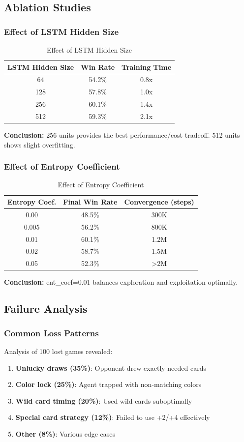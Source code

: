 \documentclass[12pt,a4paper]{article}
\begin{document}
\subsection{Ablation Studies}
\subsubsection{Effect of LSTM Hidden Size}
\begin{table}[H]
\centering
\begin{tabular}{ccc}
\toprule
\textbf{LSTM Hidden Size} & \textbf{Win Rate} & \textbf{Training Time} \\
\midrule
64 & 54.2\% & 0.8x \\
128 & 57.8\% & 1.0x \\
256 & 60.1\% & 1.4x \\
512 & 59.3\% & 2.1x \\
\bottomrule
\end{tabular}
\caption{Effect of LSTM Hidden Size}
\label{tab:lstm_size}
\end{table}
\textbf{Conclusion:} 256 units provides the best performance/cost tradeoff. 512 units shows slight overfitting.
\subsubsection{Effect of Entropy Coefficient}
\begin{table}[H]
\centering
\begin{tabular}{ccc}
\toprule
\textbf{Entropy Coef.} & \textbf{Final Win Rate} & \textbf{Convergence (steps)} \\
\midrule
0.00 & 48.5\% & 300K \\
0.005 & 56.2\% & 800K \\
0.01 & 60.1\% & 1.2M \\
0.02 & 58.7\% & 1.5M \\
0.05 & 52.3\% & >2M \\
\bottomrule
\end{tabular}
\caption{Effect of Entropy Coefficient}
\label{tab:ent_coef}
\end{table}
\textbf{Conclusion:} ent\_coef=0.01 balances exploration and exploitation optimally.
\subsection{Failure Analysis}
\subsubsection{Common Loss Patterns}
Analysis of 100 lost games revealed:
\begin{enumerate}
    \item \textbf{Unlucky draws (35\%)}: Opponent drew exactly needed cards
    \item \textbf{Color lock (25\%)}: Agent trapped with non-matching colors
    \item \textbf{Wild card timing (20\%)}: Used wild cards suboptimally
    \item \textbf{Special card strategy (12\%)}: Failed to use +2/+4 effectively
    \item \textbf{Other (8\%)}: Various edge cases
\end{enumerate}
\end{document}
